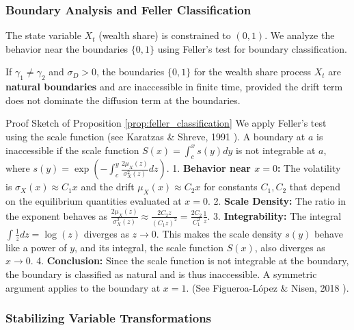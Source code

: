 \subsubsection{Boundary Analysis and Feller Classification}

The state variable $X_t$ (wealth share) is constrained to $(0,1)$. We analyze the behavior near the boundaries $\{0, 1\}$ using Feller's test for boundary classification.

\begin{proposition}
\label{prop:feller_classification}
If $\gamma_1 \neq \gamma_2$ and $\sigma_D>0$, the boundaries $\{0, 1\}$ for the wealth share process $X_t$ are \textbf{natural boundaries} and are inaccessible in finite time, provided the drift term does not dominate the diffusion term at the boundaries.
\end{proposition}

\begin{leanproofbox}{Proof Sketch of Proposition \ref{prop:feller_classification}}
We apply Feller's test using the scale function (see Karatzas & Shreve, 1991 \cite{KaratzasShreve1991}). A boundary at $a$ is inaccessible if the scale function $S(x) = \int_{c}^x s(y) dy$ is not integrable at $a$, where $s(y) = \exp(-\int_{c}^y \frac{2\mu_X(z)}{\sigma_X^2(z)} dz)$.
1.  \textbf{Behavior near $x=0$:} The volatility is $\sigma_X(x) \approx C_1 x$ and the drift $\mu_X(x) \approx C_2 x$ for constants $C_1, C_2$ that depend on the equilibrium quantities evaluated at $x=0$.
2.  \textbf{Scale Density:} The ratio in the exponent behaves as $\frac{2\mu_X(z)}{\sigma_X^2(z)} \approx \frac{2 C_2 z}{(C_1 z)^2} = \frac{2C_2}{C_1^2} \frac{1}{z}$.
3.  \textbf{Integrability:} The integral $\int \frac{1}{z} dz = \log(z)$ diverges as $z \to 0$. This makes the scale density $s(y)$ behave like a power of $y$, and its integral, the scale function $S(x)$, also diverges as $x \to 0$.
4.  \textbf{Conclusion:} Since the scale function is not integrable at the boundary, the boundary is classified as natural and is thus inaccessible. A symmetric argument applies to the boundary at $x=1$. (See Figueroa-López & Nisen, 2018 \cite{FigueroaNisen2018}).
\end{leanproofbox}

\subsubsection{Stabilizing Variable Transformations}
\label{subsec:GE_transforms}

